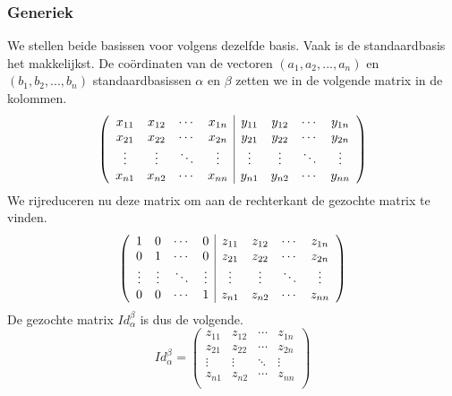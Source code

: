 \documentclass[lineaire_algebra_oplossingen.tex]{subfiles}
\begin{document}
\subsubsection*{Generiek}
We stellen beide basissen voor volgens dezelfde basis. Vaak is de standaardbasis het makkelijkst. %
De co\"ordinaten van de vectoren $(a_1,a_2,...,a_n)$ en $(b_1,b_2,...,b_n)$ standaardbasissen $\alpha$ en $\beta$ zetten we in de volgende matrix in de kolommen.
\[
\left(
\begin{array}{c c c c | c c c c}
x_{11} & x_{12} & \cdots & x_{1n} & y_{11} & y_{12} & \cdots & y_{1n}\\
x_{21} & x_{22} & \cdots & x_{2n} & y_{21} & y_{22} & \cdots & y_{2n}\\
\vdots & \vdots & \ddots & \vdots & \vdots & \vdots & \ddots & \vdots\\
x_{n1} & x_{n2} & \cdots & x_{nn} & y_{n1} & y_{n2} & \cdots & y_{nn}\\
\end{array}
\right)
\]
We rijreduceren nu deze matrix om aan de rechterkant de gezochte matrix te vinden.
\[
\left(
\begin{array}{c c c c | c c c c}
1 & 0 & \cdots & 0 & z_{11} & z_{12} & \cdots & z_{1n}\\
0 & 1 & \cdots & 0 & z_{21} & z_{22} & \cdots & z_{2n}\\
\vdots & \vdots & \ddots & \vdots & \vdots & \vdots & \ddots & \vdots\\
0 & 0 & \cdots & 1 & z_{n1} & z_{n2} & \cdots & z_{nn}\\
\end{array}
\right)
\]
De gezochte matrix $Id_\alpha^\beta$ is dus de volgende.
\[
Id_\alpha^\beta
=
\begin{pmatrix}
z_{11} & z_{12} & \cdots & z_{1n}\\
z_{21} & z_{22} & \cdots & z_{2n}\\
\vdots & \vdots & \ddots & \vdots\\
z_{n1} & z_{n2} & \cdots & z_{nn}\\
\end{pmatrix}
\]
\end{document}
